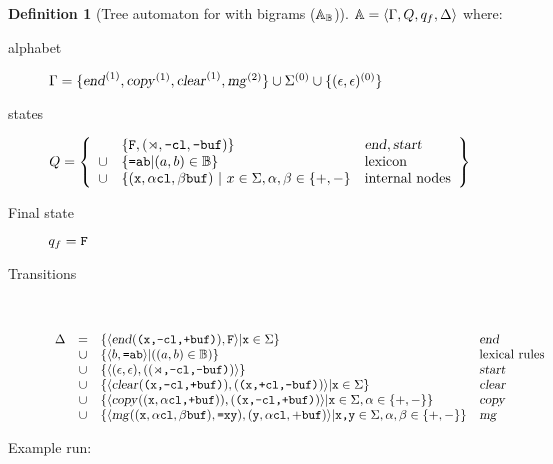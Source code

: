 \documentclass[12pt]{article}
\theoremstyle{definition}
\newtheorem{definition}{Definition}[section]
\begin{document}
\begin{definition}[Tree automaton for \OURG with bigrams \BIGR ($\mathbb{A_{\mathbb{B}}}$)]
  $\mathbb{A} = \langle \Gamma, Q, q_f, \Delta\rangle$ where:
  \begin{description}

    
  \item[alphabet] $\Gamma = \{\text{\textsl{end}}^{(1)},\text{\textsl{copy}}^{(1)},\text{\textsl{clear}}^{(1)},\text{\textsl{mg}}^{(2)}\}\cup\Sigma^{(0)}\cup\{(\epsilon,\epsilon)^{(0)}\}$
    
  \item[states]
    $Q = \left\{
    \begin{array}[H]{c l l}
      & \{\fea{F} , (\LBOUND,\fea{-cl},\fea{-buf})\} & \ed, \start\\
    \cup & \{\fea{=ab} | (a,b)\in\BIGR \} & \text{lexicon}\\
    \cup & \{(\fea{x},\alpha\fea{cl}, \beta\fea{buf}) ~|~  x\in\sg, \alpha,\beta\in\{+,-\}& \text{internal nodes}\\
    \end{array}
\right\}$

  
  \item[Final state] $q_f=\text{\texttt{F}}$

  
  \item[Transitions]\

    $
  \begin{array}[H]{r c l l}
    \Delta & = & \{\la \ed(\fea{(x,-cl,+buf)}), \fea{F}\ra | \fea{x}\in\sg\} & \ed\\
           & \cup & \{\la b, \fea{=ab}\ra | ((a,b)\in\BIGR)\}& \text{lexical rules}\\
           & \cup & \{\la (\emp,\emp),((\fea{\LBOUND,-cl,-buf)}) \ra\}& \start\\
           & \cup & \{\la \cl(\fea{(x,-cl,+buf)}), (\fea{(x,+cl,-buf)})\ra | \fea{x}\in\sg\} & \cl\\
           & \cup & \{\la \cp((\fea{x},\alpha\fea{cl,+buf})), (\fea{(x,-cl,+buf)}) \ra | \fea{x}\in\sg, \alpha\in\{+,-\} \} & \cp\\
           & \cup & \{\la \mg((\fea{x},\alpha\fea{cl},\beta\fea{buf}), \fea{=xy}),(\fea{y},\alpha\fea{cl},+\fea{buf})\ra | \fea{x,y}\in\sg, \alpha,\beta\in\{+,-\} \} & \mg\\
  \end{array}
  $
\end{description}


  
\end{definition}


Example run:
\end{document}
